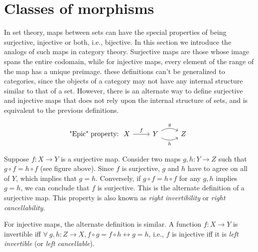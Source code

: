 \section{Classes of morphisms}

In set theory, maps between sets can have the special properties of
being surjective, injective or both, i.e., bijective. In this section
we introduce the analogs of such maps in category theory. Surjective
maps are those whose image spans the entire codomain, while for injective
maps, every element of the range of the map has a unique preimage.
these definitions can't be generalized to categories, since the objects
of a category may not have any internal structure similar to that
of a set. However, there is an alternate way to define surjective
and injective maps that does not rely upon the internal structure
of sets, and is equivalent to the previous definitions.

\[\text{"Epic" property:}\; 
\begin{tikzcd} 
X \arrow[r, "f"] & Y \arrow[r, bend left, "g"] \arrow[r, bend right, "h"'] & Z 
\end{tikzcd}\]

Suppose $f:X\rightarrow Y$ is a surjective map. Consider two maps
$g,h:Y\rightarrow Z$ such that $g\circ f=h\circ f$ (see figure above).
Since $f$ is surjective, $g$ and $h$ have to agree on all of $Y$,
which implies that $g=h$. Conversely, if $g\circ f=h\circ f$ for
any $g,h$ implies $g=h$, we can conclude that $f$ is surjective.
This is the alternate definition of a surjective map. This property
is also known as \emph{right invertibility} or \emph{right cancellability}.

For injective maps, the alternate definition is similar. A function
$f:X\rightarrow Y$ is invertible iff $\forall~g,h:Z\rightarrow X,f\circ g=f\circ h\longleftrightarrow g=h$,
i.e., $f$ is injective iff it is \emph{left invertible} (or \emph{left
cancellable}).

